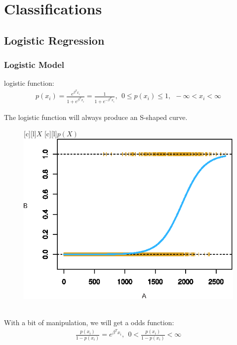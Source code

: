     \documentclass[12pt,fleqn,a4paper]{article}%
\theoremstyle{definition}
\theoremstyle{plain}
\numberwithin{equation}{section}
\begin{document}
\setcounter{section}{3}
\section{Classifications}
\subsection{\textbf{Logistic Regression}}
\subsubsection{\textbf{Logistic Model}}

logistic function:
\begin{gather}
p(x_{i}) = \frac{e^{\beta^{T}x_{i}}}{1+e^{\beta^{T}x_{i}}} = \frac{1}{1+e^{-\beta^{T}x_{i}}},~~ 0 \leq p(x_{i}) \leq 1, ~~ -\infty < x_{i} < \infty
\label{logistic-model}
\end{gather}

The logistic function will always produce an S-shaped curve.
\begin{figure}[H]
\centering
{}[c][l]{$X$}
[c][l]{$p(X)$}
\includegraphics[scale=1]{images//4_2.eps}
\\~\\
\caption{}\label{figure-4.2}
\end{figure}

With a bit of manipulation, we will get a odds function:
\begin{gather}
\frac{p(x_{i})}{1-p(x_{i})} = e^{\beta^{T}x_{i}},~~ 0< \frac{p(x_{i})}{1-p(x_{i})} < \infty
\label{odds-function}
\end{gather}
\end{document}
